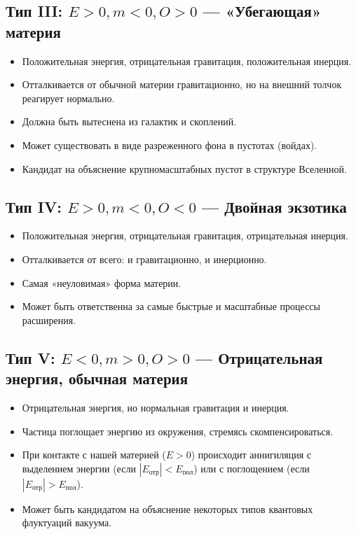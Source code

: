 \documentclass[12pt,a4paper]{article}
\begin{document}
\subsection{Тип III: $E > 0, m < 0, O > 0$ --- «Убегающая» материя}
\begin{itemize}
    \item Положительная энергия, отрицательная гравитация, положительная инерция.
    \item Отталкивается от обычной материи гравитационно, но на внешний толчок реагирует нормально.
    \item Должна быть вытеснена из галактик и скоплений.
    \item Может существовать в виде разреженного фона в пустотах (войдах).
    \item Кандидат на объяснение крупномасштабных пустот в структуре Вселенной.
\end{itemize}

\subsection{Тип IV: $E > 0, m < 0, O < 0$ --- Двойная экзотика}
\begin{itemize}
    \item Положительная энергия, отрицательная гравитация, отрицательная инерция.
    \item Отталкивается от всего: и гравитационно, и инерционно.
    \item Самая «неуловимая» форма материи.
    \item Может быть ответственна за самые быстрые и масштабные процессы расширения.
\end{itemize}

\subsection{Тип V: $E < 0, m > 0, O > 0$ --- Отрицательная энергия, обычная материя}
\begin{itemize}
    \item Отрицательная энергия, но нормальная гравитация и инерция.
    \item Частица поглощает энергию из окружения, стремясь скомпенсироваться.
    \item При контакте с нашей материей ($E > 0$) происходит аннигиляция с выделением энергии (если $|E_{\text{отр}}| < E_{\text{пол}}$) или с поглощением (если $|E_{\text{отр}}| > E_{\text{пол}}$).
    \item Может быть кандидатом на объяснение некоторых типов квантовых флуктуаций вакуума.
\end{itemize}
\end{document}

